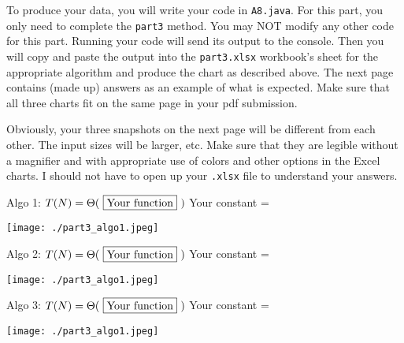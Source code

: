 \documentclass[12pt]{article}
\begin{document}
\begin{enumerate}
{     To produce your data, you will write your code in {\tt A8.java}. For this
     part, you only need to complete the {\tt part3} method. You may NOT modify
     any other code for this part. Running your code will send its output to the
     console. Then you will copy and paste the output into the {\tt part3.xlsx}
     workbook's sheet for the appropriate algorithm and produce the chart as
     described above. The next page contains (made up) answers as an example of
     what is expected. Make sure that all three charts fit on the same page in
     your pdf submission.

     Obviously, your three snapshots on the next page will be different from
     each other. The input sizes will be larger, etc. Make sure that they are
     legible without a magnifier and with appropriate use of colors and other
     options in the Excel charts. I should not have to open up your {\tt .xlsx}
     file to understand your answers.

     \newpage


     Algo 1: $T(N) =\Theta(\ \fbox{\color{black}{Your function}}\ )$
     \hfill Your constant =  \fbox{\color{black}{Your value}}

     \centerline{\texttt{[image: ./part3\_algo1.jpeg]}}


      Algo 2: $T(N) =\Theta(\ \fbox{\color{black}{Your function}}\ )$
      \hfill Your constant =  \fbox{\color{black}{Your value}}

     \centerline{\texttt{[image: ./part3\_algo1.jpeg]}}


      Algo 3: $T(N) =\Theta(\ \fbox{\color{black}{Your function}}\ )$
      \hfill Your constant =  \fbox{\color{black}{Your value}}

     \centerline{\texttt{[image: ./part3\_algo1.jpeg]}}

     \newpage



}
\end{enumerate}
\end{document}
